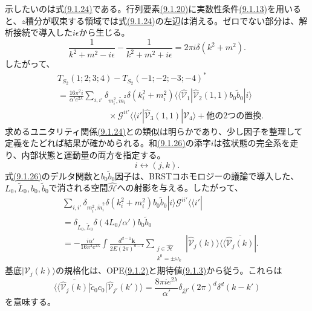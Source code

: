 示したいのは式\hyperref[eq:9.1.24]{(9.1.24)}である。行列要素\hyperref[eq:9.1.20]{(9.1.20)}に実数性条件\hyperref[eq:9.1.13]{(9.1.13)}を用いると、$z$積分が収束する領域では式\hyperref[eq:9.1.24]{(9.1.24)}の左辺は消える。ゼロでない部分は、解析接続で導入した$i\epsilon$から生じる。
\begin{equation}
 \frac1{k^2+m^2-i\epsilon}-\frac1{k^2+m^2+i\epsilon}
 =2\pi i\delta(k^2+m^2).
 \tag{9.1.25}\label{eq:9.1.25}
\end{equation}
したがって、
\begin{equation}
 \begin{aligned}
 &T_{S_2}(1;2;3;4)-T_{S_2}(-1;-2;-3;-4)^*\\
 &=\frac{16\pi^2i}{\alpha'e^{2\lambda}}
 \sum_{i,i'}\delta_{m_i^2,\tilde m_i^2}\delta(k_i^2+m_i^2)
 \langle\!\langle\widehat{\mathcal V}_1|
 \widehat{\mathcal V}_2(1,1)b_0\tilde b_0|i\rangle\\
 &\hspace{6em}\times\mathcal G^{ii'}\langle\!\langle i'|
 \widehat{\mathcal V}_3(1,1)|\widehat{\mathcal V}_4\rangle
 +\text{他の2つの置換}.
 \end{aligned}
 \tag{9.1.26}\label{eq:9.1.26}
\end{equation}
求めるユニタリティ関係\hyperref[eq:9.1.24]{(9.1.24)}との類似は明らかであり、少し因子を整理して定義をたどれば結果が確かめられる。和\hyperref[eq:9.1.26]{(9.1.26)}の添字$i$は弦状態の完全系を走り、内部状態と運動量の両方を指定する。
\begin{equation}
 i\longleftrightarrow(j,k).
 \tag{9.1.27}\label{eq:9.1.27}
\end{equation}
式\hyperref[eq:9.1.26]{(9.1.26)}のデルタ関数と$b_0\tilde b_0$因子は、BRSTコホモロジーの議論で導入した、$L_0,\tilde L_0,b_0,\tilde b_0$で消される空間$\widehat{\mathcal H}$への射影を与える。したがって、
\begin{equation}
 \begin{aligned}
 &\sum_{i,i'}\delta_{m_i^2,\tilde m_i^2}\delta(k_i^2+m_i^2)
 b_0\tilde b_0|i\rangle\mathcal G^{ii'}\langle\!\langle i'|\\
 &=\delta_{L_0,\tilde L_0}\delta(4L_0/\alpha')b_0\tilde b_0\\
 &=-\frac{i\alpha'}{16\pi^2e^{2\lambda}}
 \int\frac{d^{d-1}\bm k}{2E(2\pi)^{d-1}}
 \sum_{\substack{j\in\widehat{\mathcal H}\\ k^0=\pm\omega_k}}
 |\widehat{\mathcal V}_j(k)\rangle
 \langle\!\langle\overline{\widehat{\mathcal V}_j(k)}|.
 \end{aligned}
 \tag{9.1.28}\label{eq:9.1.28}
\end{equation}
基底$|\mathcal V_j(k)\rangle$の規格化は、OPE\hyperref[eq:9.1.2]{(9.1.2)}と期待値\hyperref[eq:9.1.3]{(9.1.3)}から従う。これらは
\begin{equation}
 \langle\!\langle\overline{\widehat{\mathcal V}_j(k)}|
 \tilde c_0c_0|\widehat{\mathcal V}_{j'}(k')\rangle
 =\frac{8\pi i e^{2\lambda}}{\alpha'}\delta_{jj'}(2\pi)^d\delta^d(k-k')
 \tag{9.1.29}\label{eq:9.1.29}
\end{equation}
を意味する。


